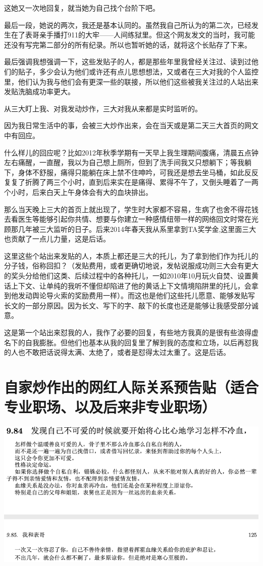 \documentclass[9pt, b5paper]{article}
\begin{document}
这她又一次地回复，就当她为自己找个台阶下吧。

最后一段，她说的两次，我还是基本认同的。虽然我自己所认为的第二次，已经发生在了表哥亲手播打911的大牢——人间练狱里。但这个网友发文的当时，我可能还没有写完第二部分的所有纪录。所以也暂听她的话，就将这个长贴存了下来。 

最后强调我想强调一下，这些发贴子的人，都是那些年里我曾经关注过、读到过他们的贴子，多少会认为他们或许还有点儿思想想法，又或者在三大对我的个人监控里，他们认为我与他们会有更深一些的联接，所以他们这些被我关注过的人站出来发贴洗脑成功率更大。

从三大盯上我、对我发动炒作，三大对我从来都是实时监听的。

因为我日常生活中的事，会被三大炒作出来，会在当天或是第二天三大首页的网文中有回应。

什么样儿的回应呢？比如2012年秋季学期有一天早上我生理期间腹痛，清晨五点钟左右痛醒，一直醒，我以为自己想上厕所，但到了洗手间我又只想躺下；等我躺下，身体不舒服，痛得只能躺在床上禁不住呻吟，可我还是想去坐马桶，如此反反复复了折腾了两三个小时，直到后来实在是痛得、累得不午了，又倒头睡着了一两个小时，后来白天上午身体会有大的血块排出。

那么当天晚上三大的首页上就出现了，学生时大家都不容易，生病了也舍不得花钱去看医生等能够引起你共情、想要与你建立一种感情纽带一样的网络回文时常在光顾那几年被三大监听的日子。后来2014年春天我从系里拿到TA奖学金,这里面三大也贡献了一点儿力量，这是后话。 

这里这些个站出来发贴的人，本质上都还是三大的托儿，为了拿到他们作为托儿的分子钱，俗称回扣？（发贴费用，或者更确切地说，发帖说服成功则三大会有更大的奖头分给他们这类、后续过程中的各种托儿，一如2010年10月玩火自焚、设置黄话上下文、让单纯的我听不懂但却陷进了他的黄话上下文情境陷阱里的托儿，会拿到他发动舆论导火索的奖励费用一样）。而这也是他们这些托儿愿意、能够发贴写长文的一部分原因。因为长文、写下的字、敲下的长度也还是能够让我感受部分诚意。

这是第一个站出来怼我的人，我作了必要的回复，有些地方我真的是很有些浪得虚名下的自我膨胀。但他们也基本从我的回复里了解到我的态度和立场，以后再怼我的人也不敢把话说得太满、太绝了，或者是怼得太过太重了。这是后话。 

\section{自家炒作出的网红人际关系预告贴（适合专业职场、以及后来非专业职场）}
\label{sec:orgf876a4b}

\begin{center}
\includegraphics[width=.9\linewidth]{./pic/p1p125.png}
\end{center}
\end{document}
